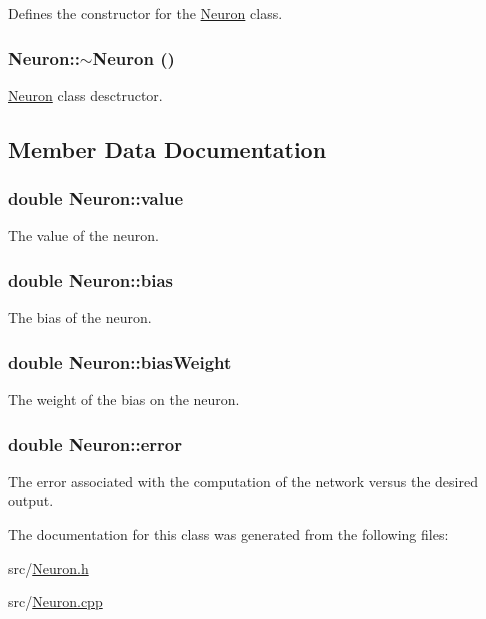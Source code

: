 Defines the constructor for the \hyperlink{classNeuron}{Neuron} class. \hypertarget{classNeuron_94a250ce7e167760e593979b899745b1}{
\subsubsection{\setlength{\rightskip}{0pt plus 5cm}Neuron::$\sim$Neuron ()}}
\label{classNeuron_94a250ce7e167760e593979b899745b1}


\hyperlink{classNeuron}{Neuron} class desctructor. 

\subsection{Member Data Documentation}
\hypertarget{classNeuron_e1988ffe53bfd53ce979aecf01a164e3}{
\subsubsection{\setlength{\rightskip}{0pt plus 5cm}double {\bf Neuron::value}}}
\label{classNeuron_e1988ffe53bfd53ce979aecf01a164e3}


The value of the neuron. \hypertarget{classNeuron_7dc59218069023c3b8348a353902b0ac}{
\subsubsection{\setlength{\rightskip}{0pt plus 5cm}double {\bf Neuron::bias}}}
\label{classNeuron_7dc59218069023c3b8348a353902b0ac}


The bias of the neuron. \hypertarget{classNeuron_27aa94b5d7658f718711cedb3f96dc7f}{
\subsubsection{\setlength{\rightskip}{0pt plus 5cm}double {\bf Neuron::biasWeight}}}
\label{classNeuron_27aa94b5d7658f718711cedb3f96dc7f}


The weight of the bias on the neuron. \hypertarget{classNeuron_d4d851d9f4f5dccb6283e5c19726e1e7}{
\subsubsection{\setlength{\rightskip}{0pt plus 5cm}double {\bf Neuron::error}}}
\label{classNeuron_d4d851d9f4f5dccb6283e5c19726e1e7}


The error associated with the computation of the network versus the desired output. 

The documentation for this class was generated from the following files:\begin{CompactItemize}
\item 
src/\hyperlink{Neuron_8h}{Neuron.h}\item 
src/\hyperlink{Neuron_8cpp}{Neuron.cpp}\end{CompactItemize}

